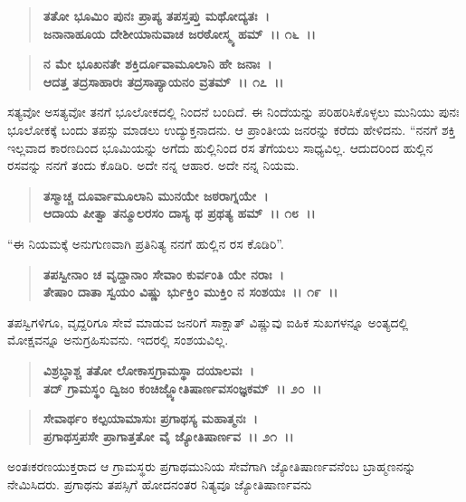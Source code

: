 \begin{verse}
\textbf{ತತೋ ಭೂಮಿಂ ಪುನಃ ಪ್ರಾಪ್ಯ ತಪಸ್ತಪ್ತು ಮಥೋದ್ಯತಃ~।}\\\textbf{ಜನಾನಾಹೂಯ ದೇಶೀಯಾನುವಾಚ ಜರಠೋಸ್ಮ್ಯ ಹಮ್~।। ೧೬~।।} 
\end{verse}

\begin{verse}
\textbf{ನ ಮೇ ಭೂಖನತೇ ಶಕ್ತಿರ್ದೂವಾಮೂಲಾನಿ ಹೇ ಜನಾಃ~।}\\\textbf{ಆದತ್ತ ತದ್ರಸಾಹಾರಃ ತದ್ರಸಾಪ್ಯಾಯನಂ ವ್ರತಮ್~।। ೧೭~।।}
\end{verse}

ಸತ್ಯವೋ ಅಸತ್ಯವೋ ತನಗೆ ಭೂಲೋಕದಲ್ಲಿ ನಿಂದನೆ ಬಂದಿದೆ. ಈ ನಿಂದೆಯನ್ನು ಪರಿಹರಿಸಿಕೊಳ್ಳಲು ಮುನಿಯು ಪುನಃ ಭೂಲೋಕಕ್ಕೆ ಬಂದು ತಪಸ್ಸು ಮಾಡಲು ಉದ್ಯುಕ್ತನಾದನು. ಆ ಪ್ರಾಂತೀಯ ಜನರನ್ನು ಕರೆದು ಹೇಳಿದನು. “ನನಗೆ ಶಕ್ತಿ ಇಲ್ಲವಾದ ಕಾರಣದಿಂದ ಭೂಮಿಯನ್ನು ಅಗೆದು ಹುಲ್ಲಿನಿಂದ ರಸ ತೆಗೆಯಲು ಸಾಧ್ಯವಿಲ್ಲ. ಆದುದರಿಂದ ಹುಲ್ಲಿನ ರಸವನ್ನು ನನಗೆ ತಂದು ಕೊಡಿರಿ. ಅದೇ ನನ್ನ ಆಹಾರ. ಅದೇ ನನ್ನ ನಿಯಮ.

\begin{verse}
\textbf{ತಸ್ಮಾಚ್ಚ ದೂರ್ವಾಮೂಲಾನಿ ಮುನಯೇ ಜಠರಾಗ್ನಯೇ~।}\\\textbf{ಆದಾಯ ಪೀತ್ವಾ ತನ್ಮೂಲರಸಂ ದಾಸ್ಯ ಥ ಪ್ರಥತ್ಯ ಹಮ್~।। ೧೮~।। }
\end{verse}

“ಈ ನಿಯಮಕ್ಕೆ ಅನುಗುಣವಾಗಿ ಪ್ರತಿನಿತ್ಯ ನನಗೆ ಹುಲ್ಲಿನ ರಸ ಕೊಡಿರಿ”.

\begin{verse}
\textbf{ತಪಸ್ವೀನಾಂ ಚ ವೃದ್ದಾನಾಂ ಸೇವಾಂ ಕುರ್ವಂತಿ ಯೇ ನರಾಃ~।}\\\textbf{ತೇಷಾಂ ದಾತಾ ಸ್ವಯಂ ವಿಷ್ಣು ರ್ಭುಕ್ತಿಂ ಮುಕ್ತಿಂ ನ ಸಂಶಯಃ~।। ೧೯~।।}
\end{verse}

ತಪಸ್ವಿಗಳಿಗೂ, ವೃದ್ದರಿಗೂ ಸೇವೆ ಮಾಡುವ ಜನರಿಗೆ ಸಾಕ್ಷಾತ್ ವಿಷ್ಣುವು ಐಹಿಕ ಸುಖಗಳನ್ನೂ ಅಂತ್ಯದಲ್ಲಿ ಮೋಕ್ಷವನ್ನೂ ಅನುಗ್ರಹಿಸುವನು. ಇದರಲ್ಲಿ ಸಂಶಯವಿಲ್ಲ.

\begin{verse}
\textbf{ವಿಶ್ರಬ್ಧಾಶ್ಚ ತತೋ ಲೋಕಾಸ್ತಗ್ರಾಮಸ್ಥಾ ದಯಾಲವಃ~।}\\\textbf{ತದ್ ಗ್ರಾಮಸ್ಥಂ ದ್ವಿಜಂ ಕಂಚಿಜ್ಜ್ಯೋತಿಷಾರ್ಣವಸಂಜ್ಞಕಮ್~।। ೨೦~।। }
\end{verse}

\begin{verse}
\textbf{ಸೇವಾರ್ಥಂ ಕಲ್ಪಯಾಮಾಸುಃ ಪ್ರಗಾಥಸ್ಯ ಮಹಾತ್ಮನಃ~।}\\\textbf{ಪ್ರಗಾಥಸ್ತಪಸೇ ಪ್ರಾಗಾತ್ತತೋ ವೈ ಜ್ಯೋತಿಷಾರ್ಣವ~।। ೨೧~।।}
\end{verse}

ಅಂತಃಕರಣಯುಕ್ತರಾದ ಆ ಗ್ರಾಮಸ್ಥರು ಪ್ರಗಾಥಮುನಿಯ ಸೇವೆಗಾಗಿ ಜ್ಯೋತಿಷಾರ್ಣವನೆಂಬ ಬ್ರಾಹ್ಮಣನನ್ನು ನೇಮಿಸಿದರು. ಪ್ರಗಾಥನು ತಪಸ್ಸಿಗೆ ಹೋದನಂತರ ನಿತ್ಯವೂ ಜ್ಯೋತಿಷಾರ್ಣವನು

